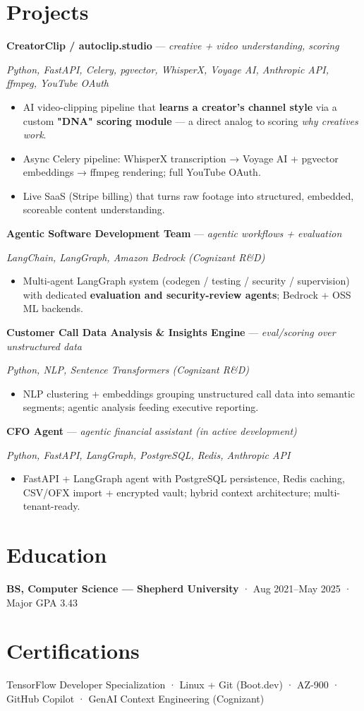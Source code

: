 \documentclass[10pt]{article}
\begin{document}
\section*{Projects}
\noindent\textbf{CreatorClip / autoclip.studio} --- \textit{creative + video understanding, scoring}\par
\noindent\textit{Python, FastAPI, Celery, pgvector, WhisperX, Voyage AI, Anthropic API, ffmpeg, YouTube OAuth}\par
\begin{itemize}
  \item AI video-clipping pipeline that \textbf{learns a creator's channel style} via a custom \textbf{"DNA" scoring module} — a direct analog to scoring \textit{why creatives work}.
  \item Async Celery pipeline: WhisperX transcription → Voyage AI + pgvector embeddings → ffmpeg rendering; full YouTube OAuth.
  \item Live SaaS (Stripe billing) that turns raw footage into structured, embedded, scoreable content understanding.
\end{itemize}
\noindent\textbf{Agentic Software Development Team} --- \textit{agentic workflows + evaluation}\par
\noindent\textit{LangChain, LangGraph, Amazon Bedrock (Cognizant R\&D)}\par
\begin{itemize}
  \item Multi-agent LangGraph system (codegen / testing / security / supervision) with dedicated \textbf{evaluation and security-review agents}; Bedrock + OSS ML backends.
\end{itemize}
\noindent\textbf{Customer Call Data Analysis \& Insights Engine} --- \textit{eval/scoring over unstructured data}\par
\noindent\textit{Python, NLP, Sentence Transformers (Cognizant R\&D)}\par
\begin{itemize}
  \item NLP clustering + embeddings grouping unstructured call data into semantic segments; agentic analysis feeding executive reporting.
\end{itemize}
\noindent\textbf{CFO Agent} --- \textit{agentic financial assistant (in active development)}\par
\noindent\textit{Python, FastAPI, LangGraph, PostgreSQL, Redis, Anthropic API}\par
\begin{itemize}
  \item FastAPI + LangGraph agent with PostgreSQL persistence, Redis caching, CSV/OFX import + encrypted vault; hybrid context architecture; multi-tenant-ready.
\end{itemize}
\section*{Education}
\noindent \textbf{BS, Computer Science — Shepherd University} · Aug 2021–May 2025 · Major GPA 3.43\par
\section*{Certifications}
\noindent TensorFlow Developer Specialization · Linux + Git (Boot.dev) · AZ-900 · GitHub Copilot · GenAI Context Engineering (Cognizant)\par
\end{document}
